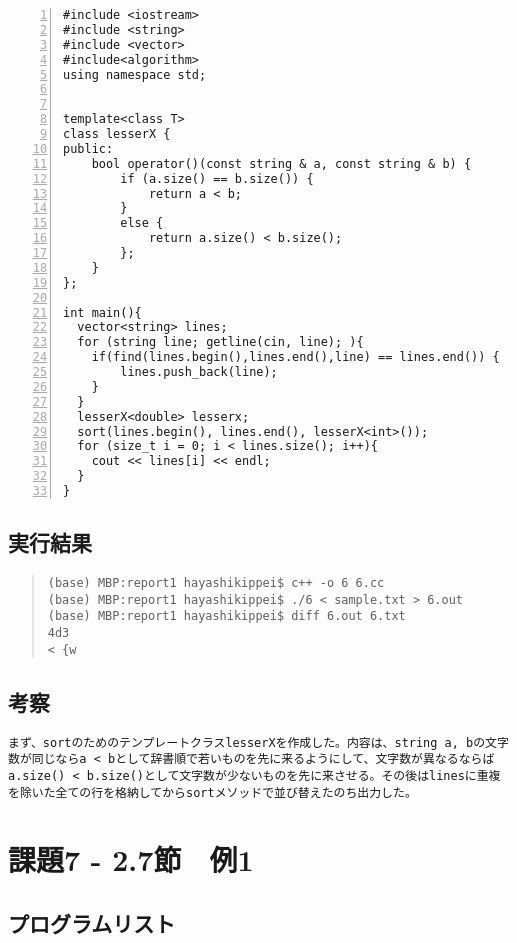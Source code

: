 \documentclass[11pt,a4paper]{jsarticle}
\begin{document}
\begin{lstlisting}[numbers=left,numberstyle=\ttfamily,xleftmargin=2zw]
#include <iostream>
#include <string>
#include <vector>
#include<algorithm>
using namespace std;


template<class T>
class lesserX {
public:
    bool operator()(const string & a, const string & b) {
        if (a.size() == b.size()) {
            return a < b;
        }
        else {
            return a.size() < b.size();
        };
    }
};

int main(){
  vector<string> lines;
  for (string line; getline(cin, line); ){
    if(find(lines.begin(),lines.end(),line) == lines.end()) {
        lines.push_back(line);
    }
  }
  lesserX<double> lesserx;
  sort(lines.begin(), lines.end(), lesserX<int>());
  for (size_t i = 0; i < lines.size(); i++){
    cout << lines[i] << endl;
  }
}

\end{lstlisting}
%
\subsection{実行結果}
\label{sec:results1}

\begin{quote}           %
\begin{verbatim}
(base) MBP:report1 hayashikippei$ c++ -o 6 6.cc
(base) MBP:report1 hayashikippei$ ./6 < sample.txt > 6.out
(base) MBP:report1 hayashikippei$ diff 6.out 6.txt
4d3
< {w

\end{verbatim}
\end{quote}
%
\subsection{考察}
\begin{verbatim}
まず、sortのためのテンプレートクラスlesserXを作成した。内容は、string a, bの文字数が同じならa < bとして辞書順で若いものを先に来るようにして、文字数が異なるならばa.size() < b.size()として文字数が少ないものを先に来させる。その後はlinesに重複を除いた全ての行を格納してからsortメソッドで並び替えたのち出力した。
\end{verbatim}
%
\section{課題7 - 2.7節　例1}
\subsection{プログラムリスト}
\label{sec:prog-list2}
\end{document}
